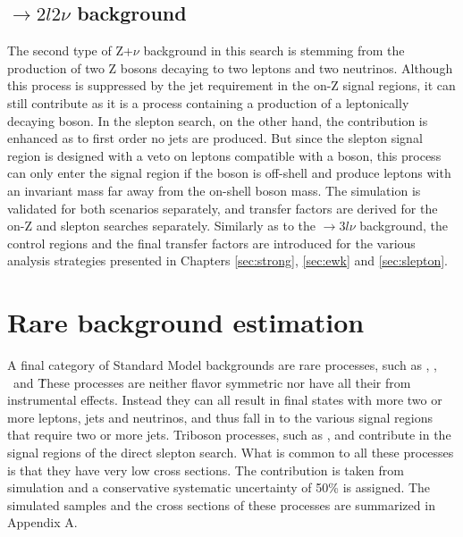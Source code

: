\subsection*{\PZZ$\rightarrow 2l2\nu$ background}\label{ZZ}
\noindent
\justify
The second type of Z+$\nu$ background in this search is stemming from the production of two Z bosons decaying to two leptons and two neutrinos. 
Although this process is suppressed by the jet requirement in the on-Z signal regions, it can still contribute as it is a process containing a production of a leptonically decaying \PZ boson. 
In the slepton search, on the other hand, the contribution is enhanced as to first order no jets are produced. 
But since the slepton signal region is designed with a veto on leptons compatible with a \PZ boson, this process can only enter the signal region if the \PZ boson is off-shell and produce leptons with an invariant mass far away from the on-shell \PZ boson mass. 
The simulation is validated for both scenarios separately, and transfer factors are derived for the on-Z and slepton searches separately. 
Similarly as to the \PWZ$\rightarrow3l\nu$ background, the control regions and the final transfer factors are introduced for the various analysis strategies presented in Chapters \ref{sec:strong}, \ref{sec:ewk} and \ref{sec:slepton}. 
\section{Rare background estimation}
\noindent\justify
A final category of Standard Model backgrounds are rare processes, such as \ttW, \ttH, \tWZ\ and \tZq\. 
These processes are neither flavor symmetric nor have all their \ptmiss from instrumental effects. 
Instead they can all result in final states with more two or more leptons, jets and neutrinos, and thus fall in to the various signal regions that require two or more jets. 
Triboson processes, such as \PWWZ, \PWZZ and \PZZZ contribute in the signal regions of the direct slepton search. 
What is common to all these processes is that they have very low cross sections. 
The contribution is taken from simulation and a conservative systematic uncertainty of 50\% is assigned.
The simulated samples and the cross sections of these processes are summarized in Appendix A.  
